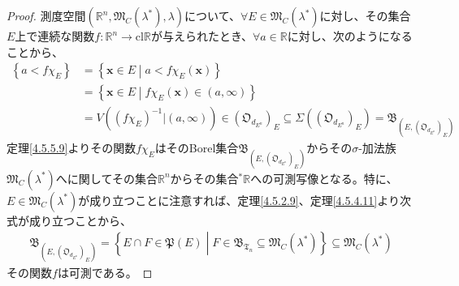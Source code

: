 \documentclass[dvipdfmx]{jsarticle}
\begin{document}
\begin{proof}
測度空間$\left( \mathbb{R}^{n},\mathfrak{M}_{C}\left( \lambda^{*} \right),\lambda \right)$について、$\forall E \in \mathfrak{M}_{C}\left( \lambda^{*} \right)$に対し、その集合$E$上で連続な関数$f:\mathbb{R}^{n} \rightarrow \mathrm{cl}\mathbb{R}$が与えられたとき、$\forall a \in \mathbb{R}$に対し、次のようになることから、
\begin{align*}
\left\{ a < f\chi_{E} \right\} &= \left\{ \mathbf{x} \in E \middle| a < f\chi_{E}\left( \mathbf{x} \right) \right\}\\
&= \left\{ \mathbf{x} \in E \middle| f\chi_{E}\left( \mathbf{x} \right) \in (a,\infty) \right\}\\
&= V\left( \left( f\chi_{E} \right)^{- 1}|(a,\infty) \right) \in \left( \mathfrak{O}_{d_{E^{n}}} \right)_{E} \subseteq \varSigma\left( \left( \mathfrak{O}_{d_{E^{n}}} \right)_{E} \right) = \mathfrak{B}_{\left( E,\left( \mathfrak{O}_{d_{E^{n}}} \right)_{E} \right)}
\end{align*}
定理\ref{4.5.5.9}よりその関数$f\chi_{E}$はそのBorel集合$\mathfrak{B}_{\left( E,\left( \mathfrak{O}_{d_{E^{n}}} \right)_{E} \right)}$からその$\sigma$-加法族$\mathfrak{M}_{C}\left( \lambda^{*} \right)$へに関してその集合$\mathbb{R}^{n}$からその集合${}^{*}\mathbb{R}$への可測写像となる。特に、$E \in \mathfrak{M}_{C}\left( \lambda^{*} \right)$が成り立つことに注意すれば、定理\ref{4.5.2.9}、定理\ref{4.5.4.11}より次式が成り立つことから、
\begin{align*}
\mathfrak{B}_{\left( E,\left( \mathfrak{O}_{d_{E^{n}}} \right)_{E} \right)} = \left\{ E \cap F \in \mathfrak{P}(E) \middle| F \in \mathfrak{B}_{\mathfrak{T}_{n}} \subseteq \mathfrak{M}_{C}\left( \lambda^{*} \right) \right\} \subseteq \mathfrak{M}_{C}\left( \lambda^{*} \right)
\end{align*}
その関数$f$は可測である。
\end{proof}
\end{document}
